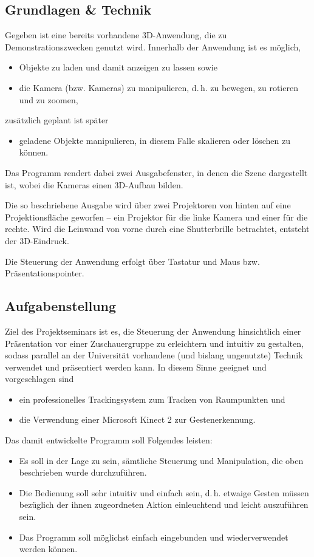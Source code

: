 \subsection{Grundlagen \& Technik}
	Gegeben ist eine bereits vorhandene 3D-Anwendung, die zu Demonstrationszwecken genutzt wird. Innerhalb der Anwendung ist es möglich,
	\begin{itemize}
		\item Objekte zu laden und damit anzeigen zu lassen sowie
		\item die Kamera (bzw. Kameras) zu manipulieren, d.\,h. zu bewegen, zu rotieren und zu zoomen,
	\end{itemize}
zusätzlich geplant ist später
	\begin{itemize}
		\item geladene Objekte manipulieren, in diesem Falle skalieren oder löschen zu können.
	\end{itemize}
	Das Programm rendert dabei zwei Ausgabefenster, in denen die Szene dargestellt ist, wobei die Kameras einen 3D-Aufbau bilden.\par
	Die so beschriebene Ausgabe wird über zwei Projektoren von hinten auf eine Projektionsfläche geworfen -- ein Projektor für die linke Kamera und einer für die rechte. Wird die \glqq Leinwand\grqq{} von vorne durch eine Shutterbrille betrachtet, entsteht der 3D-Eindruck.\par 
	Die Steuerung der Anwendung erfolgt über Tastatur und Maus bzw. Präsentationspointer.
	\subsection{Aufgabenstellung}
	Ziel des Projektseminars ist es, die Steuerung der Anwendung hinsichtlich einer Präsentation vor einer Zuschauergruppe zu erleichtern und intuitiv zu gestalten, sodass parallel an der Universität vorhandene (und bislang ungenutzte) Technik verwendet und präsentiert werden kann. In diesem Sinne geeignet und vorgeschlagen sind
	\begin{itemize}
		\item ein professionelles Trackingsystem zum Tracken von Raumpunkten und
		\item die Verwendung einer Microsoft Kinect 2 zur Gestenerkennung.
	\end{itemize}\par 
	Das damit entwickelte Programm soll Folgendes leisten:
	\begin{itemize}
		\item Es soll in der Lage zu sein, sämtliche Steuerung und Manipulation, die oben beschrieben wurde durchzuführen.
		\item Die Bedienung soll sehr intuitiv und einfach sein, d.\,h. etwaige Gesten müssen bezüglich der ihnen zugeordneten Aktion einleuchtend und leicht auszuführen sein.
		\item Das Programm soll möglichst einfach eingebunden und wiederverwendet werden können.		
	\end{itemize}